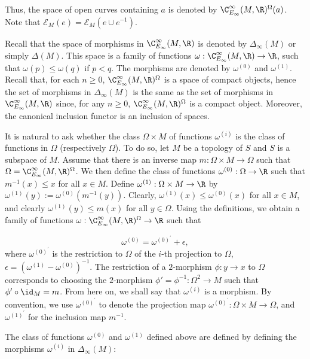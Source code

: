 \documentclass[a4paper,reqno,oneside]{article}
\begin{document}
Thus, the space of open curves containing $a$ is denoted by $\C^{\infty}_{E_\infty}(M, \R)^{\Omega}(a)$. Note that $\mathcal{E}_M(e) = \mathcal{E}_M(e \cup e^{-1})$.

Recall that the space of morphisms in $\C^{\infty}_{E_\infty}(M, \R)$ is denoted by $\Delta_{\infty}(M)$ or simply $\Delta(M)$. This space is a family of functions $\omega: \C^{\infty}_{E_\infty}(M, \R) \to \R$, such that $\omega(p) \leq \omega(q)$ if $p < q$. The morphisms are denoted by $\omega^{(0)}$ and $\omega^{(1)}$. Recall that, for each $n \ge 0$, $\C^{\infty}_{E_\infty}(M, \R)^{\Omega}$ is a space of compact objects, hence the set of morphisms in $\Delta_{\infty}(M)$ is the same as the set of morphisms in $\C^{\infty}_{E_\infty}(M, \R)$ since, for any $n \ge 0$, $\C^{\infty}_{E_\infty}(M, \R)^{\Omega}$ is a compact object. Moreover, the canonical inclusion functor is an inclusion of spaces. 

It is natural to ask whether the class $\Omega \times M$ of functions $\omega^{(i)}$ is the class of functions in $\Omega$ (respectively $\Omega$). To do so, let $M$ be a topology of $S$ and $S$ is a subspace of $M$. Assume that there is an inverse map $m: \Omega \times M \to \Omega$ such that $\Omega = \C^{\infty}_{E_\infty}(M, \R)^{\Omega}$. We then define the class of functions $\omega^{(0)}: \Omega \to \R$ such that $m^{-1}(x) \leq x$ for all $x \in M$. Define $\omega^{(1)}: \Omega \times M \to \R$ by $\omega^{(1)}(y) := \omega^{(0)}(m^{-1}(y))$. Clearly, $\omega^{(1)}(x) \leq \omega^{(0)}(x)$ for all $x \in M$, and clearly $\omega^{(1)}(y) \leq m(x)$ for all $y \in \Omega$. Using the definitions, we obtain a family of functions $\omega: \C^{\infty}_{E_\infty}(M, \R)^{\Omega} \to \R$ such that

\[
    \omega^{(0)} = \omega^{(0)}^\prime + \epsilon,
\]
where $\omega^{(0)}^\prime$ is the restriction to $\Omega$ of the $i$-th projection to $\Omega$, $\epsilon = (\omega^{(1)} - \omega^{(0)})^{-1}$. The restriction of a $2$-morphism $\phi: y \to x$ to $\Omega$ corresponds to choosing the $2$-morphism $\phi' = \phi^{-1}: \Omega^2 \to M$ such that $\phi' \circ \id_M = m$. From here on, we shall say that $\omega^{(i)}$ is a morphism. By convention, we use $\omega^{(0)}^\prime$ to denote the projection map $\omega^{(0)}^\prime: \Omega \times M \to \Omega$, and $\omega^{(1)}^\prime$ for the inclusion map $m^{-1}$. 

The class of functions $\omega^{(0)}$ and $\omega^{(1)}$ defined above are defined by defining the morphisms $\omega^{(i)}$ in $\Delta_{\infty}(M)$:
\end{document}

